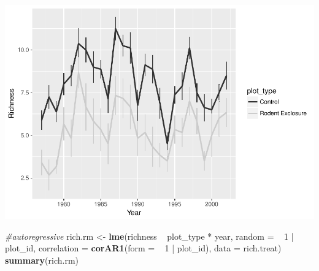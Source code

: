 \documentclass[]{article}
\newenvironment{Shaded}{\begin{snugshade}}{\end{snugshade}}
\newcommand{\KeywordTok}[1]{\textcolor[rgb]{0.13,0.29,0.53}{\textbf{{#1}}}}
\newcommand{\DataTypeTok}[1]{\textcolor[rgb]{0.13,0.29,0.53}{{#1}}}
\newcommand{\DecValTok}[1]{\textcolor[rgb]{0.00,0.00,0.81}{{#1}}}
\newcommand{\StringTok}[1]{\textcolor[rgb]{0.31,0.60,0.02}{{#1}}}
\newcommand{\CommentTok}[1]{\textcolor[rgb]{0.56,0.35,0.01}{\textit{{#1}}}}
\newcommand{\NormalTok}[1]{{#1}}
\begin{document}
\begin{Shaded}
\begin{Highlighting}[]
{{\KeywordTok{plot}\NormalTok{(rich.plot)}
\end{Highlighting}
\end{Shaded}

\includegraphics{temporal_assignment_files/figure-latex/unnamed-chunk-5-1.pdf}

\begin{Shaded}
\begin{Highlighting}[]
\CommentTok{#autoregressive}
\NormalTok{rich.rm <-}\StringTok{ }\KeywordTok{lme}\NormalTok{(richness ~}\StringTok{ }\NormalTok{plot_type *}\StringTok{ }\NormalTok{year, }\DataTypeTok{random =} \NormalTok{~}\StringTok{ }\DecValTok{1} \NormalTok{|}\StringTok{ }\NormalTok{plot_id,}
               \DataTypeTok{correlation =} \KeywordTok{corAR1}\NormalTok{(}\DataTypeTok{form =} \NormalTok{~}\StringTok{ }\DecValTok{1} \NormalTok{|}\StringTok{ }\NormalTok{plot_id),}
               \DataTypeTok{data =} \NormalTok{rich.treat)}
\KeywordTok{summary}\NormalTok{(rich.rm)}
\end{Highlighting}
\end{Shaded}
\end{document}
